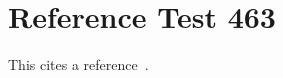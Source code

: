 \documentclass{article}
\begin{document}
\section{Reference Test 463}
This cites a reference~\cite{test463}.

\end{document}

